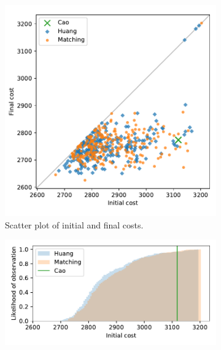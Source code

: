 \documentclass[smallextended]{svjour3}
\begin{document}
\begin{figure}
    \begin{subfigure}{.5\textwidth}
        \includegraphics[width=\linewidth]{Fig1a.pdf}
        \caption{Scatter plot of initial and final costs.}
    \end{subfigure}
    \hfill%
    \begin{subfigure}{.5\textwidth}
        \includegraphics[width=\linewidth]{Fig1b1.pdf}


\end{subfigure}
\end{figure}
\end{document}
